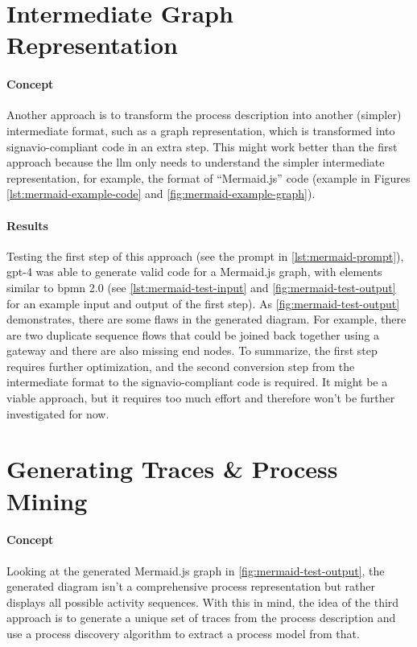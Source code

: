 \section{Intermediate Graph Representation}\label{sec:mermaid-approach}
\paragraph{Concept}
Another approach is to transform the process description into another (simpler) intermediate format, such as a graph representation, which is transformed into \gls{signavio}-compliant code in an extra step. This might work better than the first approach because the \gls{llm} only needs to understand the simpler intermediate representation, for example, the format of ``Mermaid.js''\cite{mermaid-js} code (example in Figures \ref{lst:mermaid-example-code} and \ref{fig:mermaid-example-graph}).

\paragraph{Results}
Testing the first step of this approach (see the prompt in \autoref{lst:mermaid-prompt}), \acs{gpt}-4 was able to generate valid code for a Mermaid.js graph, with elements similar to \acs{bpmn} 2.0 (see \autoref{lst:mermaid-test-input} and \autoref{fig:mermaid-test-output} for an example input and output of the first step). As \autoref{fig:mermaid-test-output} demonstrates, there are some flaws in the generated diagram. For example, there are two duplicate sequence flows that could be joined back together using a gateway and there are also missing end nodes. To summarize, the first step requires further optimization, and the second conversion step from the intermediate format to the \gls{signavio}-compliant code is required. It might be a viable approach, but it requires too much effort and therefore won't be further investigated for now.

\section{Generating Traces \& Process Mining}\label{sec:traces}
\paragraph{Concept}
Looking at the generated Mermaid.js graph in \autoref{fig:mermaid-test-output}, the generated diagram isn't a comprehensive process representation but rather displays all possible activity sequences. With this in mind, the idea of the third approach is to generate a unique set of \glspl{trace} from the process description and use a \gls{process discovery algorithm} to extract a process model from that.

